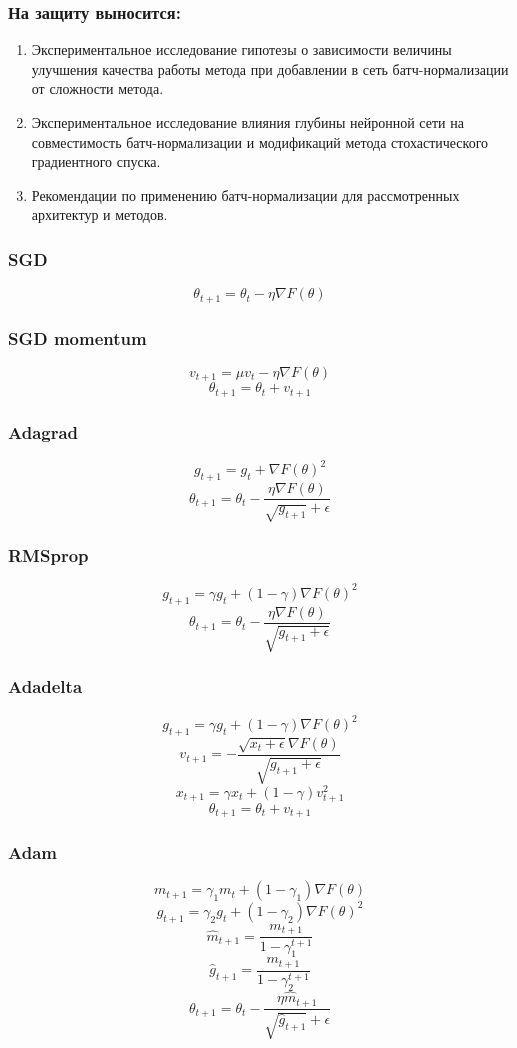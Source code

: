\documentclass{beamer}
\begin{document}
\begin{frame}
\frametitle{На защиту выносится:}
\begin{enumerate}
\item Экспериментальное исследование гипотезы о зависимости величины улучшения качества работы метода при добавлении в сеть батч-нормализации от сложности метода.
\item Экспериментальное исследование влияния глубины нейронной сети на совместимость батч-нормализации и модификаций метода стохастического градиентного спуска.
\item Рекомендации по применению батч-нормализации для рассмотренных архитектур и методов.
\end{enumerate}
\end{frame}



\begin{frame}
\frametitle{SGD}
\[\theta_{t+1} = \theta_t - \eta \nabla F(\theta)\]	
\end{frame}

\begin{frame}
\frametitle{SGD momentum}
\[v_{t+1} = \mu v_t - \eta \nabla F(\theta)\]
\[\theta_{t+1} = \theta_t + v_{t+1}\]	
\end{frame}

\begin{frame}
\frametitle{Adagrad}
\[g_{t+1} = g_t + \nabla F(\theta) ^2\]
\[\theta_{t+1} = \theta_t - \frac{\eta \nabla F(\theta)}{\sqrt{g_{t+1}} + \epsilon}\]	
\end{frame}

\begin{frame}
\frametitle{RMSprop}
\[g_{t+1} = \gamma g_t + (1 - \gamma) \nabla F(\theta)^2\]
\[\theta_{t+1} = \theta_t - \frac{\eta \nabla F(\theta)}{\sqrt{g_{t+1} + \epsilon}}\]	
\end{frame}

\begin{frame}
\frametitle{Adadelta}
\[g_{t+1} = \gamma g_t + (1 - \gamma) \nabla F(\theta)^2\]
\[v_{t+1} = - \frac{\sqrt{x_t + \epsilon} \nabla F(\theta)}{\sqrt{g_{t+1} + \epsilon}}\]
\[x_{t+1} = \gamma x_t + (1 - \gamma) v_{t+1}^2\]
\[\theta_{t+1} = \theta_t + v_{t+1}\]	
\end{frame}

\begin{frame}
\frametitle{Adam}
\[m_{t+1} = \gamma_1 m_t + (1 - \gamma_1) \nabla F(\theta)\]
\[g_{t+1} = \gamma_2 g_t + (1 - \gamma_2) \nabla F(\theta)^2\]
\[\hat{m}_{t+1} = \frac{m_{t+1}}{1 - \gamma_1^{t+1}}\]
\[\hat{g}_{t+1} = \frac{m_{t+1}}{1 - \gamma_2^{t+1}}\]
\[\theta_{t+1} = \theta_t - \frac{\eta \hat{m}_{t+1}}{\sqrt{\hat{g}_{t+1}} + \epsilon}\]	
\end{frame}

	
\end{document}
